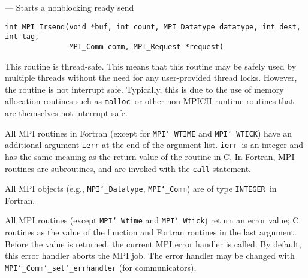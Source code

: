 \startmanpage
{}
--- Starts a nonblocking ready send 
\startvb\begin{verbatim}
int MPI_Irsend(void *buf, int count, MPI_Datatype datatype, int dest, int tag,
               MPI_Comm comm, MPI_Request *request)

\end{verbatim}
\endvb

\par
{}
\par
{}
\par
This routine is thread-safe.  This means that this routine may be
safely used by multiple threads without the need for any user-provided
thread locks.  However, the routine is not interrupt safe.  Typically,
this is due to the use of memory allocation routines such as {\tt malloc
}or other non-MPICH runtime routines that are themselves not interrupt-safe.
\par
{}
All MPI routines in Fortran (except for {\tt MPI{\tt \char`\_}WTIME} and {\tt MPI{\tt \char`\_}WTICK}) have
an additional argument {\tt ierr} at the end of the argument list.  {\tt ierr
}is an integer and has the same meaning as the return value of the routine
in C.  In Fortran, MPI routines are subroutines, and are invoked with the
{\tt call} statement.
\par
All MPI objects (e.g., {\tt MPI{\tt \char`\_}Datatype}, {\tt MPI{\tt \char`\_}Comm}) are of type {\tt INTEGER
}in Fortran.
\par
{}
\par
All MPI routines (except {\tt MPI{\tt \char`\_}Wtime} and {\tt MPI{\tt \char`\_}Wtick}) return an error value;
C routines as the value of the function and Fortran routines in the last
argument.  Before the value is returned, the current MPI error handler is
called.  By default, this error handler aborts the MPI job.  The error handler
may be changed with {\tt MPI{\tt \char`\_}Comm{\tt \char`\_}set{\tt \char`\_}errhandler} (for communicators),
